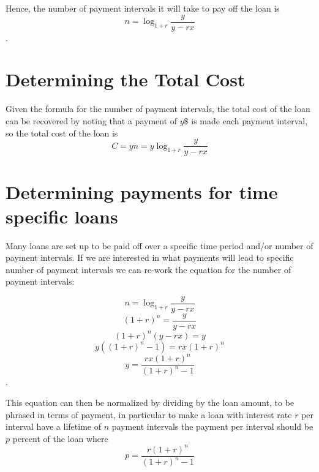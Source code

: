 \documentclass[11pt]{article} %
\begin{document}
Hence, the number of payment intervals it will take to pay off the loan is $$n = \log_{1+r} \frac{y}{y - rx}$$.

\section{Determining the Total Cost}
Given the formula for the number of payment intervals, the total cost of the loan can be recovered by noting that a payment of $y\$$ is made each payment interval, so the total cost of the loan is
$$C = yn = y\log_{1+r} \frac{y}{y - rx}$$

\section{Determining payments for time specific loans}
Many loans are set up to be paid off over a specific time period and/or number of payment intervals. If we are interested in what payments will lead to specific number of payment intervals we can re-work the equation for the number of payment intervals:

$$n = \log_{1+r} \frac{y}{y - rx}$$
$$(1+r)^{n} = \frac{y}{y-rx}$$
$$(1+r)^{n}(y-rx) = y$$
$$y( (1+r)^{n} - 1) = rx(1+r)^{n}$$
$$y = \frac{rx(1+r)^{n}}{(1+r)^{n} - 1}$$.

This equation can then be normalized by dividing by the loan amount, to be phrased in terms of payment, in particular to make a loan with interest rate $r$ per interval have a lifetime of $n$ payment intervals the payment per interval should be $p$ percent of the loan where 
$$p = \frac{r(1+r)^{n}}{(1+r)^{n} - 1}$$
\end{document}
